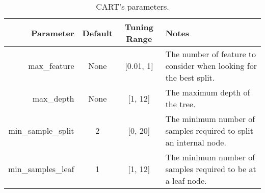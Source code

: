 \begin{table*}[!t]
\centering
\caption{CART's parameters.}\label{tbl:cart}
\begin{tabular}{r|c|c|p{2.26in}}
Parameter          & Default & Tuning Range  & Notes                                                            \\\hline
max\_feature       & None    & {[}0.01, 1{]} & The number of feature to consider when looking for the best split. \\\hline 
max\_depth         & None    & {[}1, 12{]}   & The maximum depth of the tree.                                     \\\hline 
min\_sample\_split & 2       & {[}0, 20{]}   & The minimum number of samples required to split an internal node.  \\\hline 
min\_samples\_leaf & 1       & {[}1, 12{]}   & The minimum number of samples required to be at a leaf node.      



\end{tabular}
\end{table*}